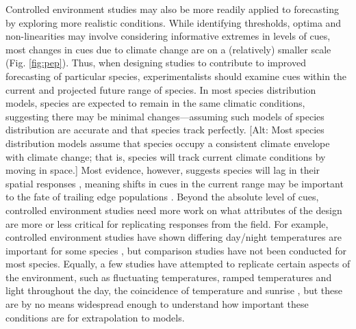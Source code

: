 \documentclass[11pt,letter]{article}
\begin{document}
Controlled environment studies may also be more readily applied to forecasting by exploring more realistic conditions. While identifying thresholds, optima and non-linearities may involve considering informative extremes in levels of cues, most changes in cues due to climate change are on a (relatively) smaller scale (Fig. \ref{fig:pep}). Thus, when designing studies to contribute to improved forecasting of particular species, experimentalists should examine cues within the current and projected future range of species. In most species distribution models, species are expected to remain in the same climatic conditions, suggesting there may be minimal changes---assuming such models of species distribution are accurate and that species track perfectly. [Alt: Most species distribution models assume that species occupy a consistent climate envelope with climate change; that is, species will track current climate conditions by moving in space.] Most evidence, however, suggests species will lag in their spatial responses \citep{Loarie:2009ax}, meaning shifts in cues in the current range may be important to the fate of trailing edge populations \citep{bertrand2011changes,lenoir2015climate,savage2015elevational}. Beyond the absolute level of cues, controlled environment studies need more work on what attributes of the design are more or less critical for replicating responses from the field. For example, controlled environment studies have shown differing day/night temperatures are important for some species \citep{heuvelink1989influence,abrol1996effects,Thingnaes2003,pressman2006exposing}, but comparison studies have not been conducted for most species. Equally, a few studies have attempted to replicate certain aspects of the environment, such as fluctuating temperatures, ramped temperatures and light throughout the day, the coincidence of temperature and sunrise \citep{erwin1998}, but these are by no means widespread enough to understand how important these conditions are for extrapolation to models. \\
\end{document}
